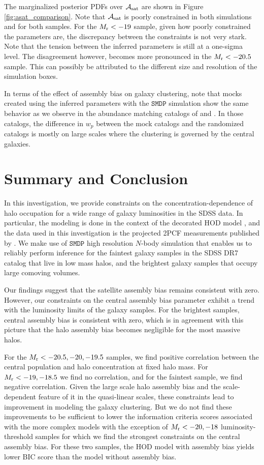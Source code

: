 The marginalized posterior PDFs over $\mathcal{A}_{\rm sat}$ are shown in Figure \ref{fig:asat_comparison}. Note that $\mathcal{A}_{\rm sat}$ is poorly constrained in both simulations and for both samples. For the $M_{\rm r}<-19$ sample, given how poorly constrained the parameters are, the discrepancy between the constraints is not very stark. Note that the tension between the inferred parameters is still at a one-sigma level. The disagreement however, becomes more pronounced in the $M_{\rm r}<-20.5$ sample. This can possibly be attributed to the different size and resolution of the simulation boxes. 

In terms of the effect of assembly bias on galaxy clustering, note that mocks created using the inferred parameters with the $\mathtt{SMDP}$ simulation show the same behavior as we observe in the abundance matching catalogs of \citealt{hw2013} and \citealt{lehman2015}. In those catalogs, the difference in $w_{p}$ between the mock catalogs and the randomized catalogs is mostly on large scales where the clustering is governed by the central galaxies. 


\section{Summary and Conclusion}\label{sec:summary}

In this investigation, we provide constraints on the concentration-dependence of halo occupation for a wide range of galaxy luminosities in the SDSS data. In particular, the modeling is done in the context of the decorated HOD model \citealt{decorated}, and the data used in this investigation is the projected 2PCF measurements published by \citealt{guo2015}. We make use of $\mathtt{SMDP}$ high resolution $N$-body simulation that enables us to reliably perform inference for the faintest galaxy samples in the SDSS DR7 catalog that live in low mass halos, and the brightest galaxy samples that occupy large comoving volumes. 

Our findings suggest that the satellite assembly bias remains consistent with zero. However, our constraints on the central assembly bias parameter exhibit a trend with the luminosity limits of the galaxy samples. For the brightest samples, central assembly bias is consistent with zero, which is in agreement with this picture that the halo assembly bias becomes negligible for the most massive halos. 

For the $M_{\rm r}<-20.5, -20, -19.5$ samples, we find positive correlation between the central population and halo concentration at fixed halo mass. For $M_{\rm r}<-19, -18.5$ we find no correlation, and for the faintest sample, we find negative correlation. Given the large scale halo assembly bias and the scale-dependent feature of it in the quasi-linear scales, these constraints lead to improvement in modeling the galaxy clustering. But we do not find these improvements to be sufficient to lower the information criteria scores associated with the more complex models with the exception of $M_{\rm r}<-20,-18$ luminosity-threshold samples for which we find the strongest constraints on the central assembly bias. For these two samples, the HOD model with assembly bias yields lower BIC score than the model without assembly bias.

